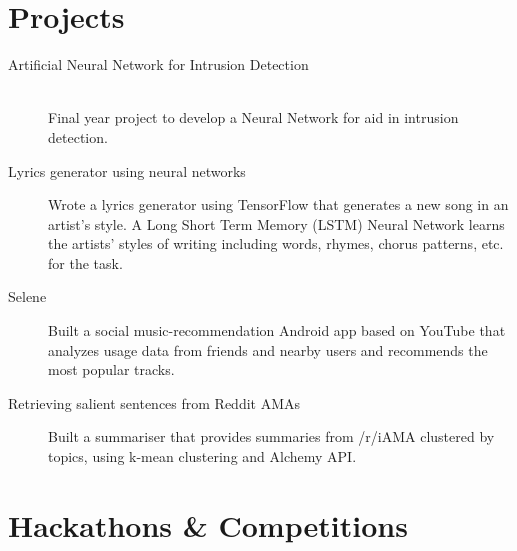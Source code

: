 \documentclass[a4paper,10pt]{extarticle} %
\begin{document}
{\section{\textcolor{primary}{Projects}}
\vspace{0.1cm}
\begin{description}
 \item[Artificial Neural Network for Intrusion Detection]\hfill \\
Final year project to develop a Neural Network for aid in intrusion detection.
 \item[Lyrics generator using neural networks] Wrote a lyrics generator using TensorFlow that generates a new song in an artist's style. A Long Short Term Memory (LSTM) Neural Network learns the artists' styles of writing including words, rhymes, chorus patterns, etc. for the task.
 \item[Selene] Built a social music-recommendation Android app based on YouTube that analyzes usage data from friends and nearby users and recommends the most popular tracks.
 \item[Retrieving salient sentences from Reddit AMAs] Built a summariser that provides summaries from /r/iAMA clustered by topics, using k-mean clustering and Alchemy API.
\end{description}


\section{\textcolor{primary}{Hackathons \& Competitions}}

}
\end{document}
